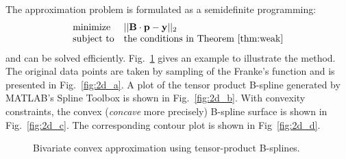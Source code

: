 \documentclass{sig-alternate}
\newcommand{\vectory}{\mathbf{y}}
\newcommand{\matrixB}{\mathbf{B}}
\newcommand{\vectorp}{\mathbf{p}}
\begin{document}
The approximation problem is formulated as a semidefinite programming:
\begin{equation}\label{eqn:2d_cvx_prog}\begin{array}{ll}
\mbox{minimize} & ||\matrixB \cdot \vectorp - \vectory||_2 \\
\mbox{subject to}& \mbox{the conditions in Theorem~\ref{thm:weak}}
\end{array}
\end{equation}
and can be solved efficiently. Fig.~\ref{fig:2d} gives an example to
illustrate the method. The original data points are taken by sampling of
the Franke's function and is presented in Fig.~\ref{fig:2d_a}. A plot
of the tensor product B-spline generated by MATLAB's Spline Toolbox is
shown in Fig.~\ref{fig:2d_b}. With convexity constraints, the convex
({\it concave} more precisely) B-spline surface is shown in
Fig.~\ref{fig:2d_c}. The corresponding contour plot is shown in
Fig~\ref{fig:2d_d}.

\begin{figure}[!htb]
\caption{Bivariate convex approximation using tensor-product
  B-splines.} 
\label{fig:2d}
\end{figure}
\end{document}
